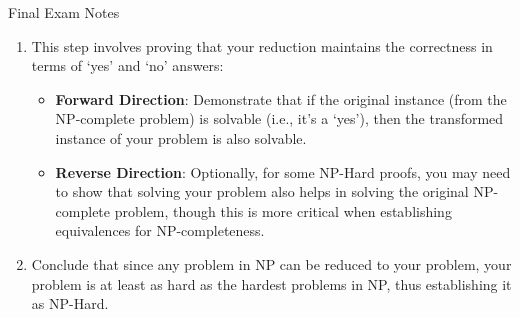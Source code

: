 \begin{examnotes}{Final Exam Notes}
\begin{highlight}
\begin{enumerate}
\begin{itemize}
            \end{itemize}
            \item This step involves proving that your reduction maintains the correctness in terms of `yes' and `no' answers:
            \begin{itemize}
                \item \textbf{Forward Direction}: Demonstrate that if the original instance (from the NP-complete problem) is solvable (i.e., it's a `yes'), then the transformed instance of your 
                problem is also solvable.
                \item \textbf{Reverse Direction}: Optionally, for some NP-Hard proofs, you may need to show that solving your problem also helps in solving the original NP-complete problem, though this 
                is more critical when establishing equivalences for NP-completeness.
            \end{itemize}
            \item Conclude that since any problem in NP can be reduced to your problem, your problem is at least as hard as the hardest problems in NP, thus establishing it as NP-Hard.
        \end{enumerate}
    \end{highlight}
\end{examnotes}